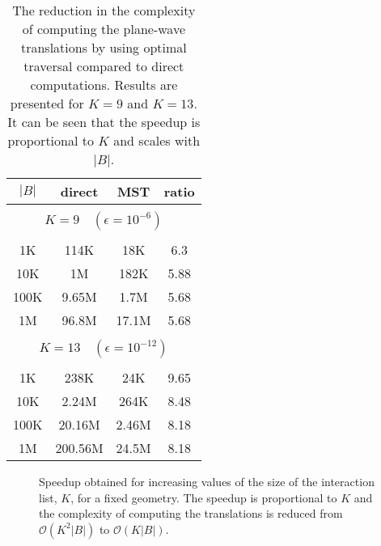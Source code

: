 \begin{table}
\caption{The reduction in the complexity of computing the plane-wave translations by using optimal traversal compared to direct computations. Results are presented for $K=9$ and $K=13$. It can be seen that the speedup is proportional to $K$ and scales with $|B|$.}
\centering
\begin{tabular}{cccc} \hline
        $|B|$  &  direct & MST & ratio \\ \hline       
        \multicolumn{4}{c}{}  \\
        \multicolumn{4}{c}{ {\small $K =  9 \quad (\epsilon = 10^{-6})$}}  \\
        \multicolumn{4}{c}{}  \\
         1K & 114K & 18K & 6.3 \\  
        10K & 1M & 182K & 5.88 \\  
       100K & 9.65M & 1.7M & 5.68 \\  
       1M & 96.8M & 17.1M & 5.68 \\  
       \multicolumn{4}{c}{}  \\
       \multicolumn{4}{c}{ {\small $K =  13 \quad (\epsilon = 10^{-12})$}}  \\
       \multicolumn{4}{c}{}  \\
             1K & 238K & 24K & 9.65 \\  
        10K & 2.24M & 264K & 8.48 \\  
        100K & 20.16M & 2.46M & 8.18 \\  
       1M &   200.56M & 24.5M & 8.18 \\   
\hline
\end{tabular}
\end{table}

\begin{figure}
  \caption{Speedup obtained for increasing values of the size of the interaction list, $K$, for a fixed geometry. The speedup is proportional to $K$ and the complexity of computing the translations is reduced from $\mathcal{O}(K^2|B|)$ to $\mathcal{O}(K|B|)$.}  
\end{figure}  






